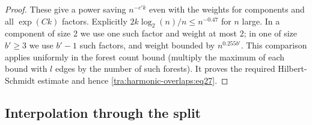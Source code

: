 \begin{proof}
These give a power saving \(n^{-c' k}\) even with the weights for components and all \(\exp(Ck)\) factors. Explicitly \(2k\log_2(n)/n\le n^{-0.47}\) for \(n\) large. In a component of size 2 we use one such factor and weight at most 2; in one of size \(b'\ge 3\) we use \(b'-1\) such factors, and weight bounded by \(n^{0.255 b'}\). This comparison applies uniformly in the forest count bound (multiply the maximum of each bound with \(l\) edges by the number of such forests). It proves the required Hilbert-Schmidt estimate and hence \eqref{tra:harmonic-overlaps:eq27}.

\end{proof}

\subsection{Interpolation through the split}


